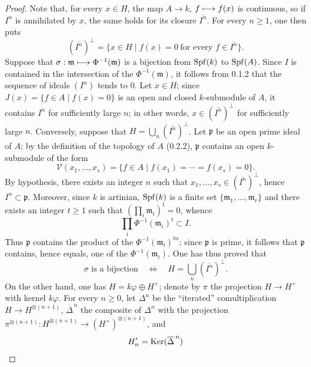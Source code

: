 \begin{proof}
Note that, for every $x\in H$, the map $A\to k$, $f\longmapsto f(x)$ is continuous, so if $I^n$ is annihilated by $x$, the same holds for its closure $\overline{I^n}$. For every $n\geq1$, one then puts
\[
(\overline{I^n})^\perp=\{x\in H\mid f(x)=0\ \text{for every }f\in\overline{I^n}\}.
\]
Suppose that $\sigma:\mathfrak m\longmapsto\Phi^{-1}(\mathfrak m)$ is a bijection from $\operatorname{Spf}(k)$ to $\operatorname{Spf}(A)$. Since $I$ is contained in the intersection of the $\Phi^{-1}(\mathfrak m)$, it follows from 0.1.2 that the sequence of ideals $(I^n)$ tends to $0$. Let $x\in H$; since $J(x)=\{f\in A\mid f(x)=0\}$ is an open and closed $k$-submodule of $A$, it contains $I^n$ for sufficiently large $n$; in other words, $x\in(\overline{I^n})^\perp$ for sufficiently large $n$.
Conversely, suppose that $H=\bigcup_n(\overline{I^n})^\perp$. Let $\mathfrak p$ be an open prime ideal of $A$; by the definition of the topology of $A$ (0.2.2), $\mathfrak p$ contains an open $k$-submodule of the form
\[
\mathcal V(x_1,\ldots,x_s)=\{f\in A\mid f(x_1)=\cdots=f(x_s)=0\}.
\]
By hypothesis, there exists an integer $n$ such that $x_1,\ldots,x_s\in(\overline{I^n})^\perp$, hence $I^n\subset\mathfrak p$. Moreover, since $k$ is artinian, $\operatorname{Spf}(k)$ is a finite set $\{\mathfrak m_1,\ldots,\mathfrak m_r\}$ and there exists an integer $t\geq1$ such that $(\prod_i\mathfrak m_i)^t=0$, whence
\[
\prod_i\Phi^{-1}(\mathfrak m_i)^t\subset I.
\]
Thus $\mathfrak p$ contains the product of the $\Phi^{-1}(\mathfrak m_i)^{tn}$; since $\mathfrak p$ is prime, it follows that $\mathfrak p$ contains, hence equals, one of the $\Phi^{-1}(\mathfrak m_i)$. One has thus proved that
\[
\sigma\text{ is a bijection}\quad\Longleftrightarrow\quad H=\bigcup_n(\overline{I^n})^\perp.
\]
On the other hand, one has $H=k\varphi\oplus H^+$; denote by $\pi$ the projection $H\to H^+$ with kernel $k\varphi$. For every $n\geq0$, let $\Delta^n$ be the ``iterated'' comultiplication $H\to H^{\otimes(n+1)}$, $\overline\Delta^{\,n}$ the composite of $\Delta^n$ with the projection $\pi^{\otimes(n+1)}:H^{\otimes(n+1)}\to(H^+)^{\otimes(n+1)}$, and
\[
\begin{aligned}
H'_n=\Ker(\overline\Delta^{\,n})

\end{aligned}\]
\end{proof}
